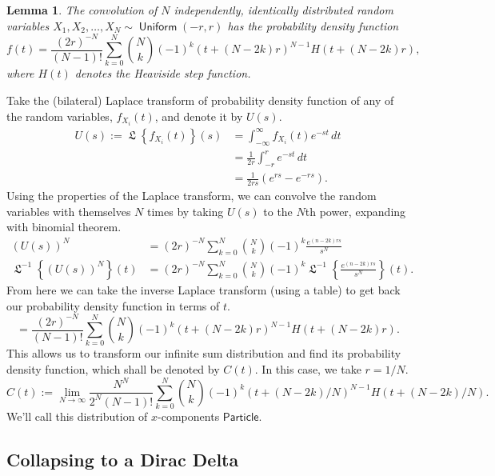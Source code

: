 \documentclass[10pt]{article}
\theoremstyle{customthm}
\newtheorem*{lemma}{Lemma}
\newenvironment{cproof}[1][\proofname]{%
  \proof[\scshape #1]%
}{\endproof}
\DeclareMathOperator{\uniform}{\textsf{Uniform}}
\newcommand{\Uniform}[2]{\ensuremath{\uniform \left(#1, #2 \right)}}
\DeclareMathOperator{\LaplaceL}{\mathfrak{L}}
\newcommand{\Laplace}[1]{\ensuremath{\LaplaceL \left\{ #1 \right\} (s)}}
\newcommand{\InvLaplace}[1]{\ensuremath{\LaplaceL^{-1} \left\{ #1 \right\} (t)}}
\begin{document}
\begin{lemma}
    The convolution of \( N \) independently, identically distributed random variables \( X_1, X_2, \ldots, X_N \sim \Uniform{-r}{r} \) has the probability density function
    \[
        f(t) = \frac{(2r)^{-N}}{(N - 1)!} \sum_{k = 0}^N \binom{N}{k} (-1)^k (t + (N - 2k)r)^{N - 1} H (t + (N - 2k)r)
    ,\]
    where \( H(t) \) denotes the Heaviside step function.
\end{lemma}

\begin{cproof}
    Take the (bilateral) Laplace transform of probability density function of any of the random variables, \( f_{X_i} (t) \), and denote it by \( U(s) \).
    \begin{align*}
        U(s) := \Laplace{f_{X_i} (t)} &= \int_{-\infty}^{\infty} f_{X_i} (t) e^{-st} \, dt \\
        &= \frac{1}{2r} \int_{-r}^{r} e^{-st} \, dt \\
        &= \frac{1}{2rs} \left( e^{rs} - e^{-rs} \right)
    .\end{align*}
    Using the properties of the Laplace transform, we can convolve the random variables with themselves \( N \) times by taking \( U(s) \) to the \( N \)th power, expanding with binomial theorem.
    \begin{align*}
        \left( U(s) \right)^N &= (2r)^{-N} \sum_{k = 0}^N \binom{N}{k} (-1)^{k} \frac{e^{(n-2k)rs}}{s^N} \\
        \InvLaplace{\left( U(s) \right)^N} &= (2r)^{-N} \sum_{k = 0}^N \binom{N}{k} (-1)^{k} \InvLaplace{\frac{e^{(n-2k)rs}}{s^N}}
    .\end{align*}
    From here we can take the inverse Laplace transform (using a table) to get back our probability density function in terms of \( t \).
    \[
        = \frac{(2r)^{-N}}{(N - 1)!} \sum_{k = 0}^N \binom{N}{k} (-1)^k (t + (N - 2k)r)^{N - 1} H (t + (N - 2k)r)
    .\]
\end{cproof}
This allows us to transform our infinite sum distribution and find its probability density function, which shall be denoted by \( C(t) \). In this case, we take \( r = 1 / N \).
\[
    C(t) := \lim_{N \to \infty} \frac{N^N}{2^N (N - 1)!} \sum_{k = 0}^N \binom{N}{k} (-1)^k (t + (N-2k)/N)^{N - 1} H(t + (N-2k)/N)
.\]
We'll call this distribution of \( x \)-components \( \textsf{Particle} \).

\subsection*{Collapsing to a Dirac Delta}
\end{document}
